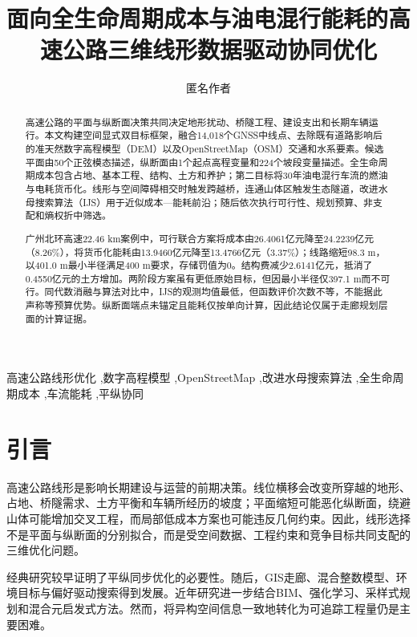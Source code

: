 \documentclass[preprint,12pt]{elsarticle}
\begin{document}
\begin{frontmatter}

\title{面向全生命周期成本与油电混行能耗的高速公路三维线形数据驱动协同优化}

\author[aff1]{匿名作者}

\begin{abstract}
高速公路的平面与纵断面决策共同决定地形扰动、桥隧工程、建设支出和长期车辆运行。本文构建空间显式双目标框架，融合14,018个GNSS中线点、去除既有道路影响后的准天然数字高程模型（DEM）以及OpenStreetMap（OSM）交通和水系要素。候选平面由50个正弦模态描述，纵断面由1个起点高程变量和224个坡段变量描述。全生命周期成本包含占地、基本工程、结构、土方和养护；第二目标将30年油电混行车流的燃油与电耗货币化。线形与空间障碍相交时触发跨越桥，连通山体区触发生态隧道，改进水母搜索算法（IJS）用于近似成本—能耗前沿；随后依次执行可行性、规划预算、非支配和熵权折中筛选。

广州北环高速22.46 km案例中，可行联合方案将成本由26.4061亿元降至24.2239亿元（8.26\%），将货币化能耗由13.9460亿元降至13.4766亿元（3.37\%）；线路缩短98.3 m，以401.0 m最小半径满足400 m要求，存储罚值为0。结构费减少2.6141亿元，抵消了0.4550亿元的土方增加。两阶段方案虽有更低原始目标，但因最小半径仅397.1 m而不可行。同代数消融与算法对比中，IJS的观测均值最低，但函数评价次数不等，不能据此声称等预算优势。纵断面端点未锚定且能耗仅按单向计算，因此结论仅属于走廊规划层面的计算证据。
\end{abstract}

\begin{keyword}
高速公路线形优化 \sep 数字高程模型 \sep OpenStreetMap \sep 改进水母搜索算法 \sep 全生命周期成本 \sep 车流能耗 \sep 平纵协同
\end{keyword}
\end{frontmatter}

\linenumbers

\section{引言}

高速公路线形是影响长期建设与运营的前期决策。线位横移会改变所穿越的地形、占地、桥隧需求、土方平衡和车辆所经历的坡度；平面缩短可能恶化纵断面，绕避山体可能增加交叉工程，而局部低成本方案也可能违反几何约束。因此，线形选择不是平面与纵断面的分别拟合，而是受空间数据、工程约束和竞争目标共同支配的三维优化问题。

经典研究较早证明了平纵同步优化的必要性\cite{chew1989,jong2003}。随后，GIS走廊、混合整数模型、环境目标与偏好驱动搜索得到发展\cite{kang2012,mondal2015,hirpa2016,vazquez2018,akhmet2022}。近年研究进一步结合BIM、强化学习、采样式规划和混合元启发式方法\cite{han2023,he2023,alhadad2024,pu2024,pu2026}。然而，将异构空间信息一致地转化为可追踪工程量仍是主要困难\cite{songreview2023}。
\end{document}
